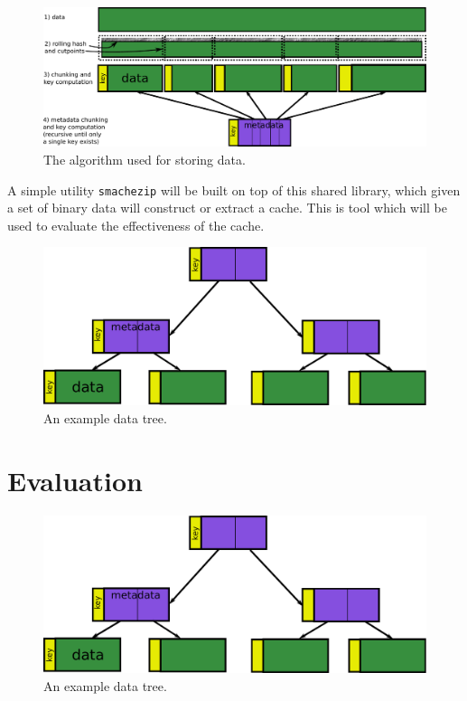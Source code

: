 \documentclass{article}[12pt]
\begin{document}
\begin{figure}
\begin{center}
\includegraphics[width=5.5in]{algo}
\caption{The algorithm used for storing data.}
\label{fig:algo}
\end{center}
\end{figure}

A simple utility {\tt smachezip} will be built on top of this shared library,
which given a set of binary data will construct or extract a cache.  This is
tool which will be used to evaluate the effectiveness of the cache.

\begin{figure}
\begin{center}
\includegraphics[width=5.5in]{tree}
\caption{An example data tree.}
\label{fig:tree}
\end{center}
\end{figure}

\section{Evaluation}
\label{sec:evaluation}

\begin{figure}
\begin{center}
\includegraphics[width=5.5in]{tree}
\caption{An example data tree.}
\label{fig:tree}
\end{center}
\end{figure}
\end{document}
